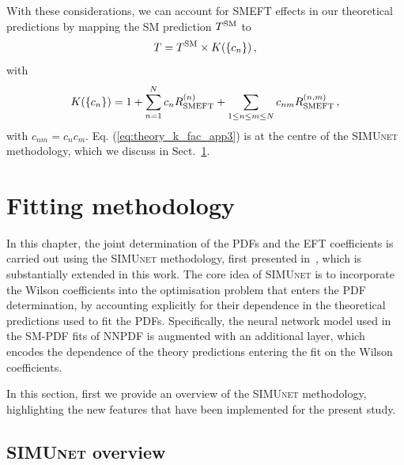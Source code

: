 \documentclass[withindex,glossary]{cam-thesis}
\newcommand{\simunet}{\textsc{SIMUnet}}
\begin{document}
With these considerations, we can account for SMEFT effects in our theoretical predictions
by mapping the SM prediction $T^{\rm SM}$ to 
%
\begin{equation}
\label{eq:theory_k_fac_app3}
 T = T^{\rm SM} \times  K(\{c_n\})\, , 
\end{equation}
%
with 
%
\begin{equation}
\label{eq:theory_k_fac}
    K(\{c_n\}) = 1+\sum_{n=1}^{N} c_n R_{\rm SMEFT}^{(n)}
    +\sum_{1 \leq n \leq m \leq N} c_{nm} R_{\rm SMEFT}^{(n,m)} \, ,
\end{equation}
%
with $c_{nm} = c_n c_m$. Eq. (\ref{eq:theory_k_fac_app3}) is at the centre of the \simunet{} methodology, which we discuss in Sect.~\ref{sec:simunet_methodology}. 


\section{Fitting methodology}
\label{sec:simunet_methodology}

In this chapter, the joint determination of the PDFs and the EFT coefficients is
carried out using the \simunet{} methodology, first presented
in~\cite{Iranipour:2022iak}, which is substantially extended in this work.
%
The core idea of  \simunet{}  is to incorporate the Wilson coefficients into the optimisation problem
that enters the PDF determination, by accounting explicitly for their dependence
in the theoretical predictions used to fit the PDFs.
%
Specifically, the neural network model used in the SM-PDF fits of NNPDF is
augmented with an additional layer, which encodes the dependence of the theory
predictions entering the fit on the Wilson coefficients.

In this section, first we provide an overview of the \simunet{}
methodology, highlighting the new features that have been implemented
for the present study.
%

\subsection{\simunet{} overview}
\label{sec:simunet}
\end{document}
